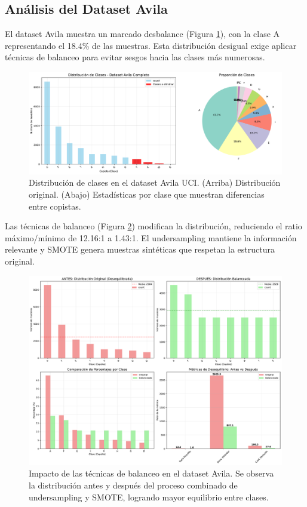 \documentclass[12pt,a4paper]{article}
\begin{document}
\subsection{Análisis del Dataset Avila}

El dataset Avila muestra un marcado desbalance (Figura \ref{fig:distribucion_avila}), con la clase A representando el 18.4\% de las muestras. Esta distribución desigual exige aplicar técnicas de balanceo para evitar sesgos hacia las clases más numerosas.

\begin{figure}[H]
    \centering
    \includegraphics[width=\textwidth]{figures/figura_06_distribucion_avila.pdf}
    \caption{Distribución de clases en el dataset Avila UCI. (Arriba) Distribución original. (Abajo) Estadísticas por clase que muestran diferencias entre copistas.}
    \label{fig:distribucion_avila}
\end{figure}

Las técnicas de balanceo (Figura \ref{fig:balanceamiento}) modifican la distribución, reduciendo el ratio máximo/mínimo de 12.16:1 a 1.43:1. El undersampling mantiene la información relevante y SMOTE genera muestras sintéticas que respetan la estructura original.

\begin{figure}[H]
    \centering
    \includegraphics[width=\textwidth]{figures/figura_08_comparacion_kmeans_avila.pdf}
    \caption{Impacto de las técnicas de balanceo en el dataset Avila. Se observa la distribución antes y después del proceso combinado de undersampling y SMOTE, logrando mayor equilibrio entre clases.}
    \label{fig:balanceamiento}
\end{figure}
\end{document}
